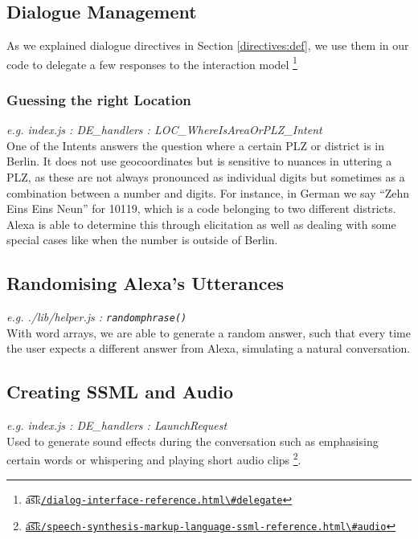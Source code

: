 \subsection*{Dialogue Management}
As we explained dialogue directives in Section \ref{directives:def}, we use them in our code to delegate a few responses to the interaction model \footnote{ \t{a\t{sk}}\href{https://developer.amazon.com/docs/custom-skills/dialog-interface-reference.html\#delegate}{\lstinline|/dialog-interface-reference.html\#delegate|}	
}


\subsubsection*{Guessing the right Location}
\textit{e.g. index.js \quad : \quad  DE\_handlers \quad :  \quad LOC\_WhereIsAreaOrPLZ\_Intent}\\
One of the Intents answers the question where a certain PLZ or district is in Berlin. It does not use geocoordinates but is sensitive to nuances in uttering a PLZ, as these are not always pronounced as individual digits but sometimes as a combination between a number and digits. For instance, in German we say ``Zehn Eins Eins Neun'' for 10119, which is a code belonging to two different districts. Alexa is able to determine this through elicitation as well as dealing with some special cases like when the number is outside of Berlin.





\subsection*{Randomising Alexa's Utterances}
\textit{e.g. ./lib/helper.js \quad : \quad  \texttt{randomphrase()}} \\
With word arrays, we are able to generate a random answer, such that every time the user expects a different answer from Alexa, simulating a natural conversation. %



\subsection*{Creating SSML and Audio}
\textit{e.g. index.js \quad : \quad  DE\_handlers \quad :  \quad LaunchRequest}\\
Used to generate sound effects during the conversation such as emphasising certain words or whispering and playing short audio clips \footnote{\href{https://developer.amazon.com/docs/custom-skills/speech-synthesis-markup-language-ssml-reference.html\#audio}{\t{a\t{sk}}\lstinline|/speech-synthesis-markup-language-ssml-reference.html\#audio|}}.







